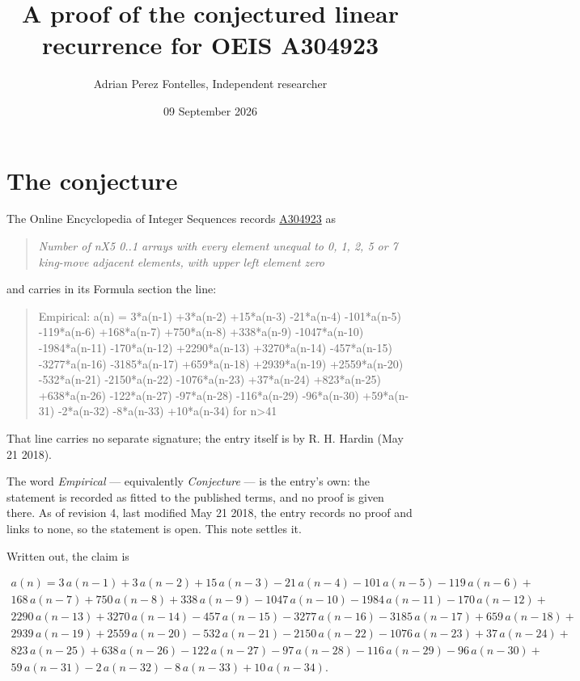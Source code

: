\documentclass[11pt]{article}
\title{A proof of the conjectured linear recurrence for OEIS A304923}
\author{Adrian Perez Fontelles, Independent researcher}
\date{09 September 2026}
\theoremstyle{definition}
\begin{document}
\maketitle
\section{The conjecture}

The Online Encyclopedia of Integer Sequences records \href{https://oeis.org/A304923}{A304923} as

\begin{quote}\itshape Number of nX5 0..1 arrays with every element unequal to 0, 1, 2, 5 or 7 king-move adjacent elements, with upper left element zero\end{quote}

and carries in its Formula section the line:

\begin{quote}\ttfamily Empirical: a(n) = 3*a(n-1) +3*a(n-2) +15*a(n-3) -21*a(n-4) -101*a(n-5) -119*a(n-6) +168*a(n-7) +750*a(n-8) +338*a(n-9) -1047*a(n-10) -1984*a(n-11) -170*a(n-12) +2290*a(n-13) +3270*a(n-14) -457*a(n-15) -3277*a(n-16) -3185*a(n-17) +659*a(n-18) +2939*a(n-19) +2559*a(n-20) -532*a(n-21) -2150*a(n-22) -1076*a(n-23) +37*a(n-24) +823*a(n-25) +638*a(n-26) -122*a(n-27) -97*a(n-28) -116*a(n-29) -96*a(n-30) +59*a(n-31) -2*a(n-32) -8*a(n-33) +10*a(n-34) for n>41\end{quote}

That line carries no separate signature; the entry itself is by R. H. Hardin (May 21 2018).

The word {\itshape Empirical} --- equivalently {\itshape Conjecture} --- is the entry's own: the statement is recorded as fitted to the published terms, and no proof is given there. As of revision 4, last modified May 21 2018, the entry records no proof and links to none, so the statement is open. This note settles it.

Written out, the claim is

\begin{multline*} a(n) = 3\,a(n-1) + 3\,a(n-2) + 15\,a(n-3) - 21\,a(n-4) - 101\,a(n-5) - 119\,a(n-6) + \\ 168\,a(n-7) + 750\,a(n-8) + 338\,a(n-9) - 1047\,a(n-10) - 1984\,a(n-11) - 170\,a(n-12) + \\ 2290\,a(n-13) + 3270\,a(n-14) - 457\,a(n-15) - 3277\,a(n-16) - 3185\,a(n-17) + 659\,a(n-18) + \\ 2939\,a(n-19) + 2559\,a(n-20) - 532\,a(n-21) - 2150\,a(n-22) - 1076\,a(n-23) + 37\,a(n-24) + \\ 823\,a(n-25) + 638\,a(n-26) - 122\,a(n-27) - 97\,a(n-28) - 116\,a(n-29) - 96\,a(n-30) + \\ 59\,a(n-31) - 2\,a(n-32) - 8\,a(n-33) + 10\,a(n-34). \end{multline*}
\end{document}
